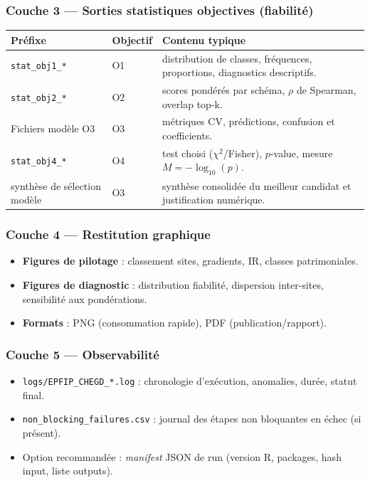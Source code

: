 \documentclass[11pt,a4paper]{article}
\begin{document}
\subsubsection{Couche 3 --- Sorties statistiques objectives (fiabilit\'e)}
\begin{center}\begin{tabular}{p{}p{}p{}}
\toprule
\textbf{Pr\'efixe} & \textbf{Objectif} & \textbf{Contenu typique} \\
\midrule
\texttt{stat\_obj1\_*} & O1 & distribution de classes, fr\'equences, proportions, diagnostics descriptifs. \\
\texttt{stat\_obj2\_*} & O2 & scores pond\'er\'es par sch\'ema, $\rho$ de Spearman, overlap top-k. \\
Fichiers modèle O3 & O3 & m\'etriques CV, pr\'edictions, confusion et coefficients. \\
\texttt{stat\_obj4\_*} & O4 & test choisi ($\chi^2$/Fisher), $p$-value, mesure $M=-\log_{10}(p)$. \\
synthèse de s\'election modèle & O3 & synthèse consolid\'ee du meilleur candidat et justification num\'erique. \\
\bottomrule
\end{tabular}\end{center}

\subsubsection{Couche 4 --- Restitution graphique}
\begin{itemize}[leftmargin=1.2cm]
  \item \textbf{Figures de pilotage} : classement sites, gradients, IR, classes patrimoniales.
  \item \textbf{Figures de diagnostic} : distribution fiabilit\'e, dispersion inter-sites, sensibilit\'e aux pond\'erations.
  \item \textbf{Formats} : PNG (consommation rapide), PDF (publication/rapport).
\end{itemize}

\subsubsection{Couche 5 --- Observabilit\'e}
\begin{itemize}[leftmargin=1.2cm]
  \item \texttt{logs/EPFIP\_CHEGD\_*.log} : chronologie d'ex\'ecution, anomalies, dur\'ee, statut final.
  \item \texttt{non\_blocking\_failures.csv} : journal des \'etapes non bloquantes en \'echec (si pr\'esent).
  \item Option recommand\'ee : \textit{manifest} JSON de run (version R, packages, hash input, liste outputs).
\end{itemize}
\end{document}
